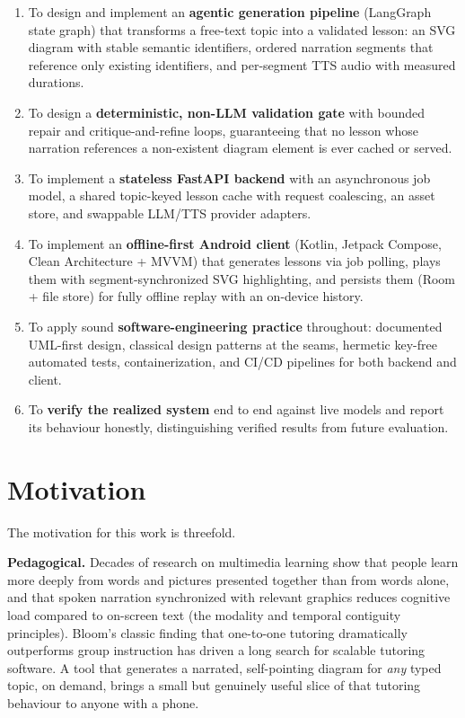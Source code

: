 \begin{enumerate}
  \item To design and implement an \textbf{agentic generation pipeline}
        (LangGraph state graph) that transforms a free-text topic into a
        validated lesson: an SVG diagram with stable semantic identifiers,
        ordered narration segments that reference only existing identifiers,
        and per-segment TTS audio with measured durations.
  \item To design a \textbf{deterministic, non-LLM validation gate} with
        bounded repair and critique-and-refine loops, guaranteeing that no
        lesson whose narration references a non-existent diagram element is
        ever cached or served.
  \item To implement a \textbf{stateless FastAPI backend} with an
        asynchronous job model, a shared topic-keyed lesson cache with request
        coalescing, an asset store, and swappable LLM/TTS provider adapters.
  \item To implement an \textbf{offline-first Android client} (Kotlin,
        Jetpack Compose, Clean Architecture + MVVM) that generates lessons via
        job polling, plays them with segment-synchronized SVG highlighting,
        and persists them (Room + file store) for fully offline replay with
        an on-device history.
  \item To apply sound \textbf{software-engineering practice} throughout:
        documented UML-first design, classical design patterns at the seams,
        hermetic key-free automated tests, containerization, and CI/CD
        pipelines for both backend and client.
  \item To \textbf{verify the realized system} end to end against live
        models and report its behaviour honestly, distinguishing verified
        results from future evaluation.
\end{enumerate}

\section{Motivation}
\label{sec:motivation}

The motivation for this work is threefold.

\textbf{Pedagogical.} Decades of research on multimedia learning show that
people learn more deeply from words and pictures presented together than from
words alone, and that spoken narration synchronized with relevant graphics
reduces cognitive load compared to on-screen text (the modality and temporal
contiguity principles). Bloom's classic finding that one-to-one tutoring
dramatically outperforms group instruction has driven a long search for
scalable tutoring software. A tool that generates a narrated, self-pointing
diagram for \emph{any} typed topic, on demand, brings a small but genuinely
useful slice of that tutoring behaviour to anyone with a phone.


